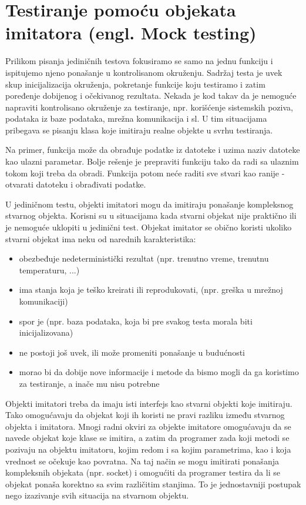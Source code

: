\section{Testiranje pomoću objekata imitatora (engl. Mock testing)}\label{testiranje-pomoux107u-objekata-imitatora-engl-mock-testing}

Prilikom pisanja jediničnih testova fokusiramo se samo na jednu funkciju i ispitujemo njeno ponašanje u kontrolisanom okruženju. Sadržaj testa je uvek skup inicijalizacija okruženja, pokretanje funkcije koju testiramo i zatim poređenje dobijenog i očekivanog rezultata. Nekada je kod takav da je nemoguće napraviti kontrolisano okruženje za testiranje, npr. korišćenje sistemskih poziva, podataka iz baze podataka, mrežna komunikacija i sl. U tim situacijama pribegava se pisanju klasa koje imitiraju realne objekte u svrhu testiranja.

Na primer, funkcija može da obrađuje podatke iz datoteke i uzima naziv datoteke kao ulazni parametar. Bolje rešenje je prepraviti funkciju tako da radi sa ulaznim tokom koji treba da obradi. Funkcija potom neće raditi sve stvari kao ranije - otvarati datoteku i obrađivati podatke.

U jediničnom testu, objekti imitatori mogu da imitiraju ponašanje kompleksnog stvarnog objekta. Korisni su u situacijama kada stvarni objekat nije praktično ili je nemoguće uklopiti u jedinični test. Objekat imitator se obično koristi ukoliko stvarni objekat ima neku od narednih karakteristika:

\begin{itemize}
\tightlist
\item
  obezbeđuje nedeterministički rezultat (npr. trenutno vreme, trenutnu temperaturu, ...)
\item
  ima stanja koja je teško kreirati ili reprodukovati, (npr. greška u mrežnoj komunikaciji)
\item
  spor je (npr. baza podataka, koja bi pre svakog testa morala biti inicijalizovana)
\item
  ne postoji još uvek, ili može promeniti ponašanje u budućnosti
\item
  morao bi da dobije nove informacije i metode da bismo mogli da ga koristimo za testiranje, a inače mu nisu potrebne
\end{itemize}

Objekti imitatori treba da imaju isti interfejs kao stvarni objekti koje imitiraju. Tako omogućavaju da objekat koji ih koristi ne pravi razliku između stvarnog objekta i imitatora. Mnogi radni okviri za objekte imitatore omogućavaju da se navede objekat koje klase se imitira, a zatim da programer zada koji metodi se pozivaju na objektu imitatoru, kojim redom i sa kojim parametrima, kao i koja vrednost se očekuje kao povratna. Na taj način se mogu imitirati ponašanja kompleksnih objekata (npr. socket) i omogućiti da programer testira da li se objekat ponaša korektno sa svim različitim stanjima. To je jednostavniji postupak nego izazivanje svih situacija na stvarnom objektu.

